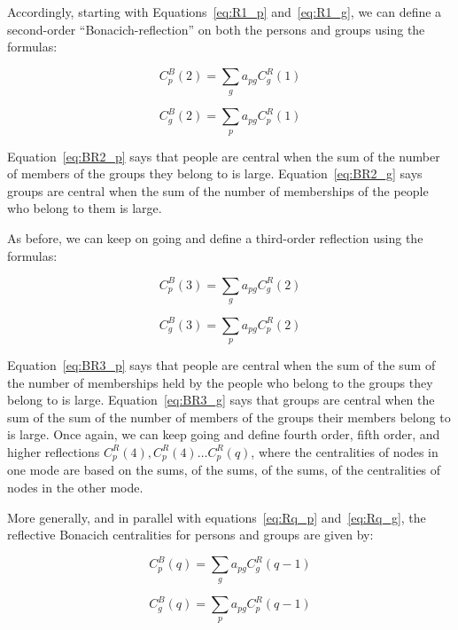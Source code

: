 \documentclass[a4paper,fleqn]{cas-sc}
\begin{document}
Accordingly, starting with Equations~\ref{eq:R1_p} and~\ref{eq:R1_g}, we can define a second-order ``Bonacich-reflection'' on both the persons and groups using the formulas:

\begin{equation}
   C^B_p(2) = \sum_g a_{pg}C^R_g(1)
   \label{eq:BR2_p}
\end{equation} 

\begin{equation}
   C^B_g(2) = \sum_p a_{pg}C^R_p(1)
   \label{eq:BR2_g}
\end{equation}

Equation~\ref{eq:BR2_p} says that people are central when the sum of the number of members of the groups they belong to is large. Equation~\ref{eq:BR2_g} says groups are central when the sum of the number of memberships of the people who belong to them is large. 

As before, we can keep on going and define a third-order reflection using the formulas:

\begin{equation}
   C^B_p(3) = \sum_g a_{pg}C^R_g(2)
   \label{eq:BR3_p}
\end{equation} 

\begin{equation}
   C^B_g(3) = \sum_p a_{pg}C^R_p(2)
   \label{eq:BR3_g}
\end{equation}

Equation~\ref{eq:BR3_p} says that people are central when the sum of the sum of the number of memberships held by the people who belong to the groups they belong to is large. Equation~\ref{eq:BR3_g} says that groups are central when the sum of the sum of the number of members of the groups their members belong to is large. Once again, we can keep going and define fourth order, fifth order, and higher reflections $C^R_p(4), C^R_p(4) \ldots C^R_p(q)$, where the centralities of nodes in one mode are based on the sums, of the sums, of the sums, of the centralities of nodes in the other mode.

More generally, and in parallel with equations~\ref{eq:Rq_p} and~\ref{eq:Rq_g}, the reflective Bonacich centralities for persons and groups are given by:

\begin{equation}
   C^B_p(q) = \sum_g a_{pg}C^R_g(q-1)
   \label{eq:BRq_p}
\end{equation} 

\begin{equation}
   C^B_g(q) = \sum_p a_{pg}C^R_p(q-1)
   \label{eq:BRq_g}
\end{equation} 
\end{document}
